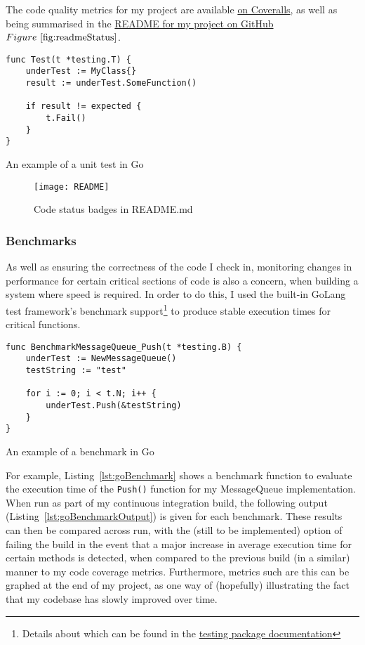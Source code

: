 The code quality metrics for my project are available
\href{https://coveralls.io/github/FireEater64/gamq?branch=master}{on Coveralls},
as well as being summarised in the
\href{https://github.com/FireEater64/gamq/blob/master/README.md}{README for my
project on GitHub}\(Figure~\ref{fig:readmeStatus} \).

\begin{listing}
\centering
  \begin{verbatim}
func Test(t *testing.T) {
	underTest := MyClass{}
	result := underTest.SomeFunction()

	if result != expected {
		t.Fail()
	}
}
  \end{verbatim}
  \caption{An example of a unit test in Go}
  \label{lst:goUnitTest}
\end{listing}

\begin{figure}
  \texttt{[image: README]}
  \centering
  \caption{Code status badges in README.md}
  \label{fig:readmeStatus}
\end{figure}

\subsubsection{Benchmarks}
\label{subs:Benchmarks}

As well as ensuring the correctness of the code I check in, monitoring changes in
performance for certain critical sections of code is also a concern, when building
a system where speed is required. In order to do this, I used the built-in GoLang
test framework's benchmark support\footnote{Details about which can be found in
the \href{https://golang.org/pkg/testing/}{testing package documentation}} to produce
stable execution times for critical functions.

\begin{listing}
  \centering
  \begin{verbatim}
func BenchmarkMessageQueue_Push(t *testing.B) {
	underTest := NewMessageQueue()
	testString := "test"

	for i := 0; i < t.N; i++ {
		underTest.Push(&testString)
	}
}
  \end{verbatim}
  \caption{An example of a benchmark in Go}
  \label{lst:goBenchmark}
\end{listing}

For example,
Listing~\ref{lst:goBenchmark} shows a benchmark function to evaluate the execution time
of the \texttt{Push()} function for my MessageQueue implementation. When
run as part of my continuous integration build, the following output
(Listing~\ref{lst:goBenchmarkOutput}) is given for each benchmark. These results
can then be compared across run, with the (still to be implemented) option of
failing the build in the event that a major increase in average execution time
for certain methods is detected, when compared to the previous build (in a similar)
manner to my code coverage metrics. Furthermore, metrics such are this can be
graphed at the end of my project, as one way of (hopefully) illustrating the
fact that my codebase has slowly improved over time.

